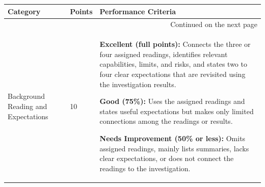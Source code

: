 \documentclass[12pt,letterpaper]{article}
\begin{document}
\begin{longtable}{|p{}|p{}|p{}|}
    \hline
    \textbf{Category}                            & \textbf{Points} & \textbf{Performance Criteria}                                                                                                                                                                                                                                                                                                                                                                                                                                                                                                                                                                                                                                                                                                                             \\
    \hline
    \endhead
    \hline
    \multicolumn{3}{r}{Continued on the next page}                                                                                                                                                                                                                                                                                                                                                                                                                                                                                                                                                                                                                                                                                                                                                                             \\
    \endfoot
    \hline
    \endlastfoot
    Background Reading and Expectations          & 10              & \textbf{Excellent (full points):} Connects the three or four assigned readings, identifies relevant capabilities, limits, and risks, and states two to four clear expectations that are revisited using the investigation results. \par\medskip \textbf{Good (75\%):} Uses the assigned readings and states useful expectations but makes only limited connections among the readings or results. \par\medskip \textbf{Needs Improvement (50\% or less):} Omits assigned readings, mainly lists summaries, lacks clear expectations, or does not connect the readings to the investigation.                                                                                                                                                               \\

\end{longtable}
\end{document}
